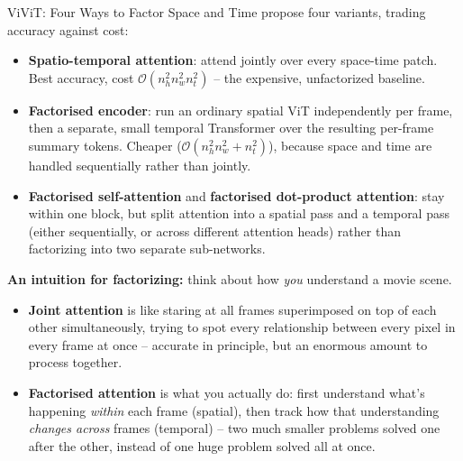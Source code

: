 \begin{vbframe}{ViViT: Four Ways to Factor Space and Time}
 propose four variants, trading accuracy against cost:
\begin{itemize}
  \item \textbf{Spatio-temporal attention}: attend jointly over every space-time patch. Best accuracy, cost $\mathcal{O}(n_h^2 n_w^2 n_t^2)$ -- the expensive, unfactorized baseline.
  \item \textbf{Factorised encoder}: run an ordinary spatial ViT independently per frame, then a separate, small temporal Transformer over the resulting per-frame summary tokens. Cheaper ($\mathcal{O}(n_h^2 n_w^2 + n_t^2)$), because space and time are handled sequentially rather than jointly.
  \item \textbf{Factorised self-attention} and \textbf{factorised dot-product attention}: stay within one block, but split attention into a spatial pass and a temporal pass (either sequentially, or across different attention heads) rather than factorizing into two separate sub-networks.
\end{itemize}

\framebreak

\textbf{An intuition for factorizing:} think about how \emph{you} understand a movie scene.
\begin{center}
\end{center}
\begin{itemize}
  \item \textbf{Joint attention} is like staring at all frames superimposed on top of each other simultaneously, trying to spot every relationship between every pixel in every frame at once -- accurate in principle, but an enormous amount to process together.
  \item \textbf{Factorised attention} is what you actually do: first understand what's happening \emph{within} each frame (spatial), then track how that understanding \emph{changes across} frames (temporal) -- two much smaller problems solved one after the other, instead of one huge problem solved all at once.
\end{itemize}
\end{vbframe}

